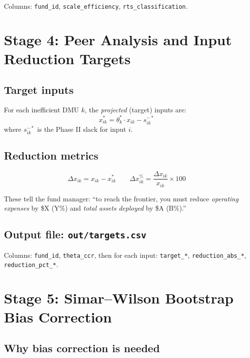 \documentclass[12pt,a4paper]{article}
\begin{document}
Columns: \texttt{fund\_id}, \texttt{scale\_efficiency}, \texttt{rts\_classification}.

\section{Stage 4: Peer Analysis and Input Reduction Targets}

\subsection{Target inputs}

For each inefficient DMU $k$, the \emph{projected} (target) inputs are:
\[
    x_{ik}^* = \theta_k^* \cdot x_{ik} - s^{-*}_{ik}
\]
where $s^{-*}_{ik}$ is the Phase II slack for input $i$.

\subsection{Reduction metrics}

\[
    \Delta x_{ik} = x_{ik} - x_{ik}^*
    \qquad
    \Delta x_{ik}^{\%} = \frac{\Delta x_{ik}}{x_{ik}} \times 100
\]

These tell the fund manager: ``to reach the frontier, you must reduce
\textit{operating expenses} by \$X (Y\%) and \textit{total assets deployed} by \$A (B\%).''

\subsection{Output file: \texttt{out/targets.csv}}

Columns: \texttt{fund\_id}, \texttt{theta\_ccr}, then for each input:
\texttt{target\_*}, \texttt{reduction\_abs\_*}, \texttt{reduction\_pct\_*}.

\section{Stage 5: Simar--Wilson Bootstrap Bias Correction}

\subsection{Why bias correction is needed}
\end{document}

